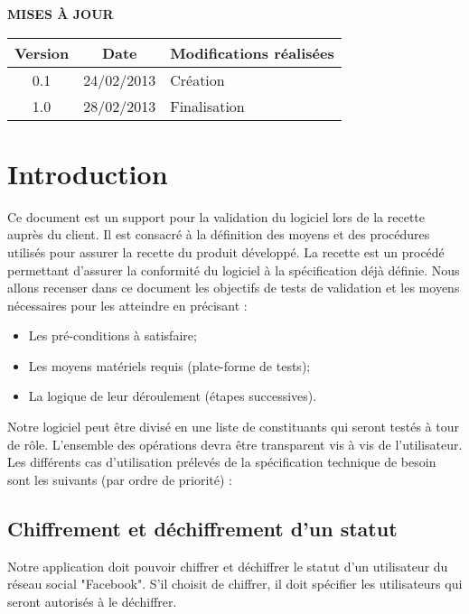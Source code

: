 \documentclass[a4paper,11pt,french]{article}
\begin{document}
\makeFirstPage
\clearpage

\vspace*{1cm}
\begin{center}
\textbf{\huge{MISES À JOUR}}\\
\vspace*{3cm}
\begin{tabularx}{16cm}{|c|c|X|}
\hline
\bfseries{Version} & \bfseries{Date} & \bfseries{Modifications réalisées}\\
\hline
0.1 & 24/02/2013 & Création\\
\hline
1.0 & 28/02/2013 & Finalisation\\
\hline
\end{tabularx}
\end{center}

\clearpage
\tableofcontents
\clearpage

\section{Introduction}

Ce document est un support pour la validation du logiciel lors de la recette
auprès du client. Il est consacré à la définition des moyens et des
procédures utilisés pour assurer la recette du produit développé. La recette
est un procédé permettant d’assurer la conformité du logiciel à la
spécification déjà définie. Nous allons recenser dans ce document les
objectifs de tests de validation et les moyens nécessaires pour les atteindre
en précisant :
\begin{itemize}
	\item Les pré-conditions à satisfaire;
	\item Les moyens matériels requis (plate-forme de tests);
	\item La logique de leur déroulement (étapes successives).
\end{itemize}
Notre logiciel peut être divisé en une liste de constituants qui seront
testés à tour de rôle. L'ensemble des opérations devra être transparent
vis à vis de l'utilisateur. Les différents cas d’utilisation prélevés
de la spécification technique de besoin sont les suivants (par ordre de
priorité) :

\subsection*{Chiffrement et déchiffrement d'un statut}
Notre application doit pouvoir chiffrer et déchiffrer le statut d'un
utilisateur du réseau social "Facebook". S'il choisit de chiffrer, il
doit spécifier les utilisateurs qui seront autorisés à le déchiffrer.
\end{document}
